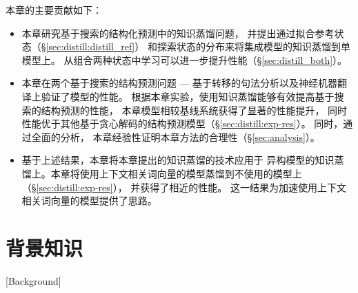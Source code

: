 本章的主要贡献如下：
\begin{itemize}
	\item 本章研究基于搜索的结构化预测中的知识蒸馏问题，
	并提出通过拟合参考状态（\S\ref{sec:distill:distill_ref}）
	和探索状态的分布来将集成模型的知识蒸馏到单模型上。
	从组合两种状态中学习可以进一步提升性能（\S\ref{sec:distill_both}）。
	
	\item 本章在两个基于搜索的结构预测问题 --- 
	基于转移的句法分析以及神经机器翻译上验证了模型的性能。
	根据本章实验，使用知识蒸馏能够有效提高基于搜索的结构预测的性能，
	本章模型相较基线系统获得了显著的性能提升，
	同时性能优于其他基于贪心解码的结构预测模型（\S\ref{sec:distill:exp-res}）。
	同时，通过全面的分析，
	本章经验性证明本章方法的合理性（\S\ref{sec:analysis}）。
	
	\item 基于上述结果，本章将本章提出的知识蒸馏的技术应用于
	异构模型的知识蒸馏上。本章将使用上下文相关词向量的模型蒸馏到不使用的模型上（\S\ref{sec:distill:exp-res}），
	并获得了相近的性能。
	这一结果为加速使用上下文相关词向量的模型提供了思路。
\end{itemize}

\section{背景知识}[Background]

